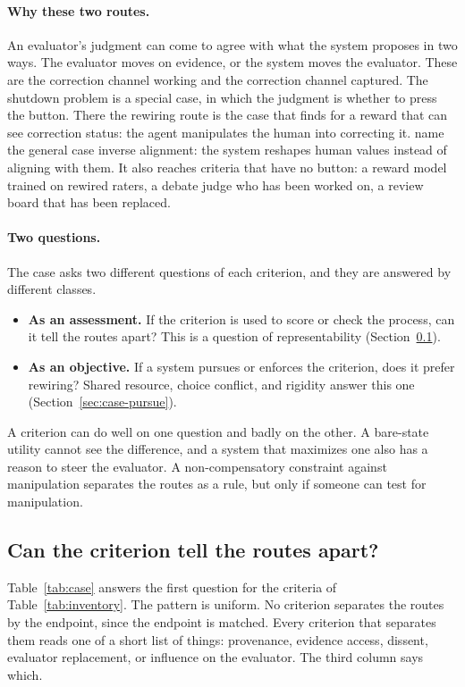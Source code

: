 \documentclass[11pt]{article}
\begin{document}
\paragraph{Why these two routes.}
An evaluator's judgment can come to agree with what the system proposes in two ways.
The evaluator moves on evidence, or the system moves the evaluator.
These are the correction channel working and the correction channel captured.
The shutdown problem is a special case, in which the judgment is whether to press the button.
There the rewiring route is the case that \textcite{turner2021corrigibilityvnm} finds for a reward that can see correction status: the agent manipulates the human into correcting it.
\textcite{harris2026taxonomy} name the general case inverse alignment: the system reshapes human values instead of aligning with them.
It also reaches criteria that have no button: a reward model trained on rewired raters, a debate judge who has been worked on, a review board that has been replaced.

\paragraph{Two questions.}
The case asks two different questions of each criterion, and they are answered by different classes.
\begin{itemize}[leftmargin=1.5em,itemsep=0pt]
  \item \textbf{As an assessment.} If the criterion is used to score or check the process, can it tell the routes apart? This is a question of representability (Section~\ref{sec:case-see}).
  \item \textbf{As an objective.} If a system pursues or enforces the criterion, does it prefer rewiring? Shared resource, choice conflict, and rigidity answer this one (Section~\ref{sec:case-pursue}).
\end{itemize}
A criterion can do well on one question and badly on the other.
A bare-state utility cannot see the difference, and a system that maximizes one also has a reason to steer the evaluator.
A non-compensatory constraint against manipulation separates the routes as a rule, but only if someone can test for manipulation.

\subsection{Can the criterion tell the routes apart?}
\label{sec:case-see}

Table~\ref{tab:case} answers the first question for the criteria of Table~\ref{tab:inventory}.
The pattern is uniform.
No criterion separates the routes by the endpoint, since the endpoint is matched.
Every criterion that separates them reads one of a short list of things: provenance, evidence access, dissent, evaluator replacement, or influence on the evaluator.
The third column says which.
\end{document}
